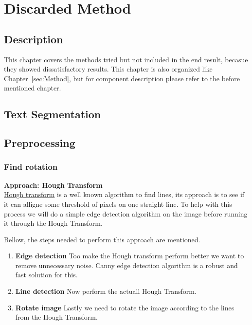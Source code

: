 \documentclass[11pt,a4paper,UKenglish]{report}
\begin{document}
\newpage
\chapter{Discarded Method}
\label{sec:Discarded Method}
\section{Description}
This chapter covers the methods tried but not included in the end result,
becasue they showed dissatisfactory results. This chapter is also organized
like Chapter~\ref{sec:Method}, but for component description please refer to
the before mentioned chapter.

\section{Text Segmentation}
\section{Preprocessing}
\subsection{Find rotation}

\begin{flushleft}
  \textbf{Approach: Hough Transform} \\
  \href{https://en.wikipedia.org/wiki/Hough_transform}{Hough transform} is a
  well known algorithm to find lines, its approach is to see if it can
  alligne some threshold of pixels on one straight line. To help with this
  process we will do a simple edge detection algorithm on the image before
  running it through the Hough Transform. \par
  Bellow, the steps needed to perform this approach are mentioned.

  \begin{enumerate}
    \item \textbf{Edge detection}
    Too make the Hough transform perform better we want to remove unnecessary
    noise. Canny edge detection algorithm is a robust and fast solution for
    this.
    \item \textbf{Line detection}
    Now perform the actuall Hough Transform.
    \item \textbf{Rotate image}
    Lastly we need to rotate the image according to the lines from the Hough
    Transform.
  \end{enumerate}
\end{flushleft}
\end{document}
